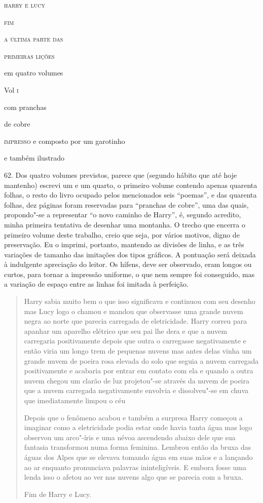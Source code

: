 \begin{center}
\textsc{harry e lucy}

\textsc{fim}

\textsc{a última parte das}

\bigskip

\textsc{primeiras lições}

\bigskip

em quatro volumes

Vol \textsc{i}

com pranchas

de cobre

\medskip

\textsc{impresso} e composto por um garotinho

e também ilustrado

\end{center}

62. Dos quatro volumes previstos, parece que (segundo hábito que até
hoje mantenho) escrevi um e um quarto, o primeiro volume contendo apenas
quarenta folhas, o resto do livro ocupado pelos mencionados seis
``poemas'', e das quarenta folhas, dez páginas foram reservadas para
``pranchas de cobre'', uma das quais, propondo"-se a representar ``o novo
caminho de Harry'', é, segundo acredito, minha primeira tentativa de
desenhar uma montanha. O trecho que encerra o primeiro volume deste
trabalho, creio que seja, por vários motivos, digno de preservação. Eu o
imprimi, portanto, mantendo as divisões de linha, e as três variações de
tamanho das imitações dos tipos gráficos. A pontuação será deixada à
indulgente apreciação do leitor. Os hífens, deve ser observado, eram
longos ou curtos, para tornar a impressão uniforme, o que nem sempre foi
conseguido, mas a variação de espaço entre as linhas foi imitada à
perfeição.

\begin{quote}
Harry sabia muito bem
o que isso significava
e continuou com seu
desenho mas Lucy logo
o chamou e mandou que
observasse uma grande
nuvem negra ao norte
que parecia carregada
de eletricidade. Harry
correu
para apanhar um aparelho elétrico que seu pai lhe dera e que a nuvem
carregaria positivamente depois que outra o carregasse negativamente e
então viria um longo trem de pequenas nuvens mas antes delas vinha um
grande nuvem de poeira rosa elevada do solo que seguia a nuvem carregada
positivamente e acabaria por entrar em contato com ela e quando a outra
nuvem chegou um clarão de luz projetou"-se através da nuvem de poeira que
a nuvem carregada negativamente envolvia e dissolveu"-se em chuva que
imediatamente limpou o céu

Depois que o fenômeno acabou e também a surpresa Harry começou a
imaginar como a eletricidade podia estar onde havia tanta água mas logo
observou um arco"-íris e uma névoa ascendendo abaixo dele que sua
fantasia transformou numa forma feminina. Lembrou então da bruxa das
águas dos Alpes que se elevava tomando água em suas mãos e a lançando ao
ar enquanto pronunciava palavras ininteligíveis. E embora fosse uma
lenda isso o afetou ao ver nas nuvens algo que se parecia com a bruxa.

\hfill{}Fim de Harry e Lucy.
\end{quote}

